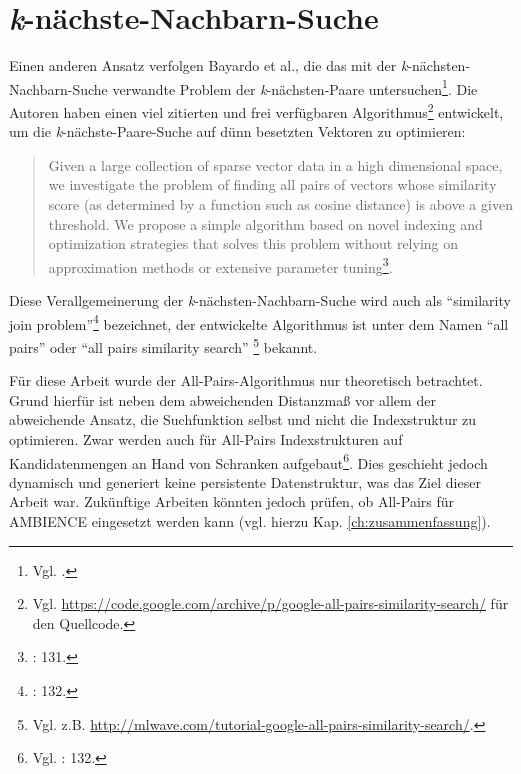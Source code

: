 \section{\textit{k}-nächste-Nachbarn-Suche}\label{sec:bloom-knn}
Einen anderen Ansatz verfolgen Bayardo et al., die das mit der \textit{k}-nächsten-Nachbarn-Suche verwandte Problem der \textit{k}-nächsten-Paare untersuchen\footnote{Vgl. \cite{Bayardo2007}.}. Die Autoren haben einen viel zitierten und frei verfügbaren Algorithmus\footnote{Vgl. \url{https://code.google.com/archive/p/google-all-pairs-similarity-search/} für den Quell\-code.} entwickelt, um die \textit{k}-nächste-Paare-Suche auf dünn besetzten Vektoren zu optimieren: 
\begin{quote}
Given a large collection of sparse vector data in a high dimensional space, we investigate the problem of finding all pairs of vectors whose similarity score (as determined by a function such as cosine distance) is above a given threshold. We propose a simple algorithm based on novel indexing and optimization strategies that solves this problem without relying on approximation methods or extensive parameter tuning\footnote{\cite{Bayardo2007}: 131.}. 
\end{quote}
Diese Verallgemeinerung der \textit{k}-nächsten-Nachbarn-Suche wird auch als "`similarity join problem"'\footnote{\cite{Bayardo2007}: 132.} bezeichnet, der entwickelte Algorithmus ist unter dem Namen "`all pairs"' oder "`all pairs similarity search"' \footnote{Vgl. z.B. \url{http://mlwave.com/tutorial-google-all-pairs-similarity-search/}.} bekannt. 

Für diese Arbeit wurde der All-Pairs-Algorithmus nur theoretisch betrachtet. Grund hierfür ist neben dem abweichenden Distanzmaß vor allem der abweichende Ansatz, die Suchfunktion selbst und nicht die Indexstruktur zu optimieren. Zwar werden auch für All-Pairs Indexstrukturen auf Kandidatenmengen an Hand von Schranken aufgebaut\footnote{Vgl. \cite{Bayardo2007}: 132.}. Dies geschieht jedoch dynamisch und generiert keine persistente Datenstruktur, was das Ziel dieser Arbeit war. Zukünftige Arbeiten könnten jedoch prüfen, ob All-Pairs für AMBIENCE eingesetzt werden kann (vgl. hierzu Kap. \ref{ch:zusammenfassung}). 